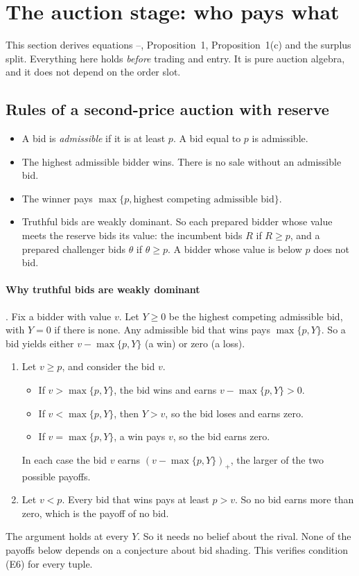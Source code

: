 \section{The auction stage: who pays what}\label{sec:03_auction}

This section derives equations --, Proposition~1, Proposition~1(c) and the surplus
split. Everything here holds \emph{before} trading and entry. It is pure auction algebra, and it does not
depend on the order slot.

\subsection{Rules of a second-price auction with reserve}\label{sec:03_auction-rules}

\begin{itemize}
\item A bid is \emph{admissible} if it is at least \(p\). A bid equal to \(p\) is admissible.
\item The highest admissible bidder wins. There is no sale without an admissible bid.
\item The winner pays \(\max\{p,\text{highest competing admissible bid}\}\).
\item Truthful bids are weakly dominant. So each prepared bidder whose value meets the reserve bids its
value: the incumbent bids \(R\) if \(R\ge p\), and a prepared challenger bids \(\theta\) if \(\theta\ge p\).
A bidder whose value is below \(p\) does not bid.
\end{itemize}

\paragraph{Why truthful bids are weakly dominant} . Fix a bidder with value \(v\). Let
\(Y\ge0\) be the highest competing admissible bid, with \(Y=0\) if there is none. Any admissible bid that
wins pays \(\max\{p,Y\}\). So a bid yields either \(v-\max\{p,Y\}\) (a win) or zero (a loss).
\begin{enumerate}
\item Let \(v\ge p\), and consider the bid \(v\).
\begin{itemize}
\item If \(v>\max\{p,Y\}\), the bid wins and earns \(v-\max\{p,Y\}>0\).
\item If \(v<\max\{p,Y\}\), then \(Y>v\), so the bid loses and earns zero.
\item If \(v=\max\{p,Y\}\), a win pays \(v\), so the bid earns zero.
\end{itemize}
In each case the bid \(v\) earns \((v-\max\{p,Y\})_+\), the larger of the two possible payoffs.
\item Let \(v<p\). Every bid that wins pays at least \(p>v\). So no bid earns more than zero, which is the
payoff of no bid.
\end{enumerate}
The argument holds at every \(Y\). So it needs no belief about the rival. None of the payoffs below
depends on a conjecture about bid shading. This verifies condition (E6) for every tuple.


